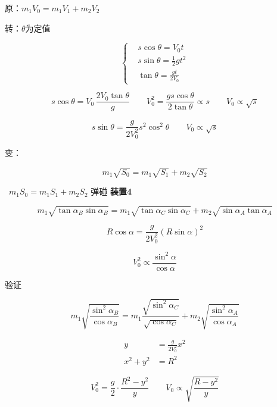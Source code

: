 
原：$m_1V_0=m_1V_1+m_2V_2$

转：$\theta$为定值

\[
\left\{
\begin{aligned}
& s\cos\theta=V_0t\\
& \boxed{s\sin\theta=\tfrac{1}{2}gt^2}\\
& \tan\theta=\frac{gt}{2V_0}
\end{aligned}
\right.
\] %

\[
s\cos\theta=V_0\,\frac{2V_0\tan\theta}{g}\qquad V_0^2=\frac{gs\cos\theta}{2\tan\theta}\propto s\qquad V_0\propto\sqrt{s}
\]

\[
s\sin\theta=\frac{g}{2V_0^2}s^2\cos^2\theta\qquad V_0\propto\sqrt{s}
\]

变：
\begin{keybox}
\[m_1\sqrt{S_0}=m_1\sqrt{S_1}+m_2\sqrt{S_2}\]
\end{keybox}

\ $m_1S_0=m_1S_1+m_2S_2$ 弹碰 %
\textbf{装置4}


\[
m_1\sqrt{\tan\alpha_B\sin\alpha_B}=m_1\sqrt{\tan\alpha_C\sin\alpha_C}+m_2\sqrt{\sin\alpha_A\tan\alpha_A}
\] %

\[R\cos\alpha=\frac{g}{2V_0^2}(R\sin\alpha)^2\]

\[V_0^2\propto\frac{\sin^2\alpha}{\cos\alpha}\]

验证
\begin{keybox}
\[
m_1\sqrt{\frac{\sin^2\alpha_B}{\cos\alpha_B}}=m_1\frac{\sqrt{\sin^2\alpha_C}}{\sqrt{\cos\alpha_C}}+m_2\sqrt{\frac{\sin^2\alpha_A}{\cos\alpha_A}}
\] %
\end{keybox}

\begin{align*}
y&=\frac{g}{2V_0^2}x^2\\
x^2+y^2&=R^2
\end{align*}


\[V_0^2=\frac{g}{2}\cdot\frac{R^2-y^2}{y}\qquad V_0\propto\sqrt{\frac{R-y^2}{y}}\] %


